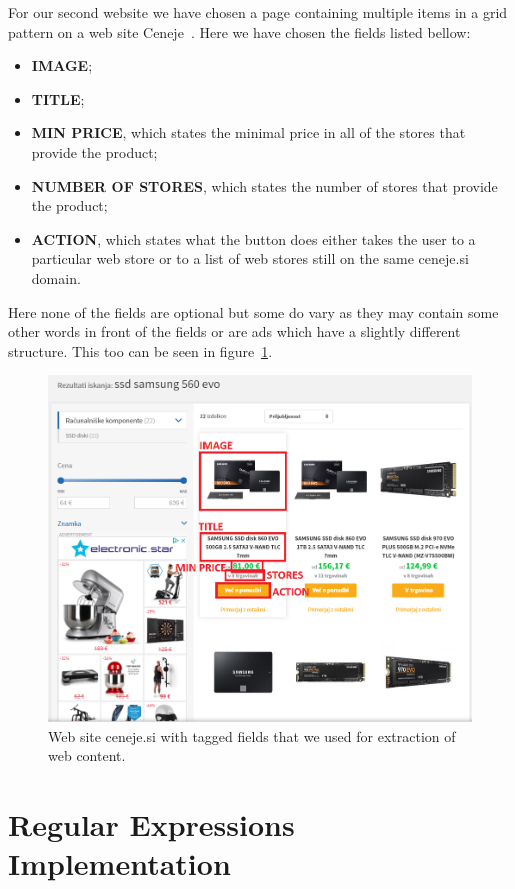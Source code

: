 \documentclass[9pt]{IEEEtran}
\begin{document}
For our second website we have chosen a page containing multiple items in a grid pattern on a web site Ceneje~\cite{ceneje}.
Here we have chosen the fields listed bellow:
\begin{itemize}
\item{\textbf{IMAGE};}
\item{\textbf{TITLE};}
\item{\textbf{MIN PRICE}, which states the minimal price in all of the stores that provide the product;}
\item{\textbf{NUMBER OF STORES}, which states the number of stores that provide the product;}
\item{\textbf{ACTION}, which states what the button does either takes the user to a particular web store or to a list of web stores still on the same ceneje.si domain.}
\end{itemize}
Here none of the fields are optional but some do vary as they may contain some other words in front of the fields or are ads which have a slightly different structure.
This too can be seen in figure~\ref{fig_ceneje}.


\begin{figure}[ht]
    \centering
    \includegraphics[width=1\columnwidth]{ceneje.png}
    \caption{Web site ceneje.si with tagged fields that we used for extraction of web content.}
    \label{fig_ceneje}
\end{figure}


\section{Regular Expressions Implementation}
\end{document}
